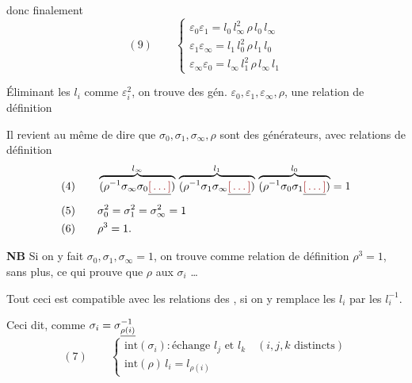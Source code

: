\documentclass[11pt,a4paper]{article}
\begin{document}
donc finalement
\[
(9) \qquad
\begin{cases}
\varepsilon_0\varepsilon_1 = l_0\, l_\infty^2\, \rho\, l_0\, l_\infty \\
\varepsilon_1\varepsilon_\infty = l_1\, l_0^2\, \rho\, l_1\, l_0 \\
\varepsilon_\infty\varepsilon_0 = l_\infty\, l_1^2\, \rho\, l_\infty\, l_1
\end{cases}
\]


Éliminant les $l_i$ comme $\varepsilon_i^2$, on trouve des gén.
$\varepsilon_0, \varepsilon_1, \varepsilon_\infty, \rho$, une relation de
définition


Il revient au même de dire que $\sigma_0, \sigma_1, \sigma_\infty, \rho$ sont des
générateurs, avec relations de définition
\[
\begin{aligned}
&(4) \qquad
\overbrace{(\rho^{-1}\sigma_\infty\sigma_0 \struck{\ill{}})}^{l_\infty}\,
\overbrace{(\rho^{-1}\sigma_1\sigma_\infty \struck{\ill{}})}^{l_1}\,
\overbrace{(\rho^{-1}\sigma_0\sigma_1 \struck{\ill{}})}^{l_0} = 1 \\
&(5) \qquad \sigma_0^2 = \sigma_1^2 = \sigma_\infty^2 = 1 \\
&(6) \qquad \rho^3 = 1.
\end{aligned}
\]


\textbf{NB} Si on y fait  $\sigma_0, \sigma_1, \sigma_\infty = 1$,
on trouve comme relation de définition $\rho^3 = 1$, \struck{\ill{}} sans plus,
ce qui prouve  que $\rho$ 
\ill{}  aux $\sigma_i$ …


Tout ceci est compatible avec les relations des ,
 
\struck{\ill{}} si on y remplace les $l_i$ par les $l_i^{-1}$.

Ceci dit, comme $\sigma_i = \sigma^{-1}_{\uncertain{\rho(i)}}$
\[
(7) \qquad
\begin{cases}
\mathrm{int}(\sigma_i) : \text{échange } l_j \text{ et } l_k \quad (i, j, k \text{ distincts}) \\
\mathrm{int}(\rho)\, l_i = l_{\rho(i)}
\end{cases}
\]
\end{document}
